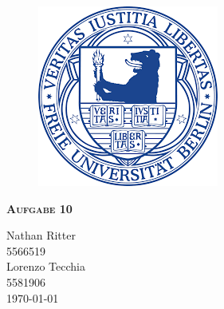 \documentclass{report}
\begin{document}
\begin{center}
    
\end{center}
    \begin{figure}[htb]
            \centering\includegraphics[width=.5\textwidth]{Immagini/FUlogo.png}
    \end{figure}
    

 {\centering\scshape\LARGE\bfseries Aufgabe 10
    \begin{center}
       Nathan Ritter  \\ 5566519 \\
       Lorenzo Tecchia \\ 5581906  \\ \today
    \end{center}}


    \newpage
    
    \tableofcontents
    
    
    
    
    
    \printbibliography
    
\end{document}
